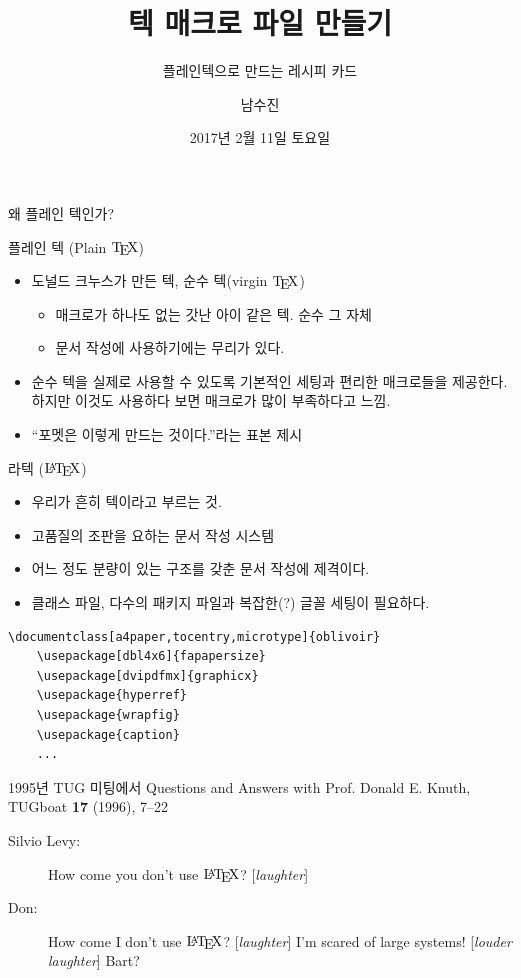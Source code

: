 \documentclass{beamer}
\title{텍 매크로 파일 만들기}
\subtitle{플레인텍으로 만드는 레시피 카드}
\date{2017년 2월 11일 토요일}
\author{남수진}
\institute{
  2017 한국텍학회 학술대회 및 정기총회 \\
  동국대학교 법학관 B253호}
\def\TEX/{$\textrm{\TeX}$}
\def\LATEX/{$\textrm{\LaTeX}$}
\begin{document}
\maketitle

%
\begin{frame}[standout]
  왜 플레인 텍인가?
\end{frame}


%
\begin{frame}[fragile]{플레인 텍 (Plain \TEX/)}
  \begin{itemize}
  \item 도널드 크누스가 만든 텍, \alert{순수 텍(virgin \TEX/)}
    \begin{itemize}
    \item 매크로가 하나도 없는 갓난 아이 같은 텍. 순수 그 자체
    \item 문서 작성에 사용하기에는 무리가 있다.
    \end{itemize}
  \item 순수 텍을 실제로 사용할 수 있도록 기본적인 세팅과 편리한 매크로들을 제공한다.
    하지만 이것도 사용하다 보면 매크로가 많이 부족하다고 느낌.
  \item ``포멧은 이렇게 만드는 것이다.''라는 표본 제시
  \end{itemize}
\end{frame}


%
\begin{frame}[fragile]{라텍 (\LATEX/)}
  \begin{itemize}
  \item 우리가 흔히 텍이라고 부르는 것.
  \item 고품질의 조판을 요하는 문서 작성 시스템
  \item 어느 정도 분량이 있는 구조를 갖춘 문서 작성에 제격이다.
  \item 클래스 파일, 다수의 패키지 파일과 복잡한(?) 글꼴 세팅이 필요하다.
  \end{itemize}
  
  \begin{Verbatim}[fontsize=\small]
    \documentclass[a4paper,tocentry,microtype]{oblivoir}
    \usepackage[dbl4x6]{fapapersize}
    \usepackage[dvipdfmx]{graphicx}
    \usepackage{hyperref}
    \usepackage{wrapfig}
    \usepackage{caption}
    ...
  \end{Verbatim}
\end{frame}


%
\begin{frame}{1995년 TUG 미팅에서}
  Questions and Answers with Prof. Donald E. Knuth, 
  TUGboat \textbf{17} (1996), 7--22
  \begin{description}
  \item[Silvio Levy:] How come you don't use \LATEX/? [\textsl{laughter}]
  \item[Don:] How come I don't use \LATEX/? [\textsl{laughter}]
    I'm scared of \alert{large systems!} [\textsl{louder laughter\/}]
    Bart?
  \end{description}
\end{frame}
\end{document}
